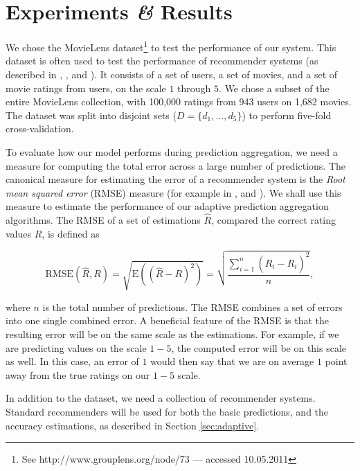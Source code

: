 \section{Experiments \emph{\&} Results}
\label{sec:results}

We chose the MovieLens dataset\footnote{
See http://www.grouplens.org/node/73 --- accessed 10.05.2011}
to test the performance of our system.
This dataset is often used to test the performance of recommender systems
(as described in 
\cite[p9]{Alshamri2008}, \cite[p4]{Lemire2005}, \cite[p1]{Adomavicius2005} and \cite[p2]{Herlocker2004}).
It consists of a set of users, a set of movies, and a set of movie ratings from users,
on the scale $1$ through $5$.
We chose a subset of the entire MovieLens collection, with 100,000 ratings from 943 users on 1,682 movies.
The dataset was split into disjoint sets
($D = \{ d_1, ..., d_5 \}$) to perform five-fold cross-validation.

To evaluate how our model performs during prediction aggregation, 
we need a measure for computing the total error across a large number of predictions.
The canonical measure for estimating the error of a recommender system
is the \emph{Root mean squared error} (RMSE) measure
(for example in \cite[p17]{Herlocker2004}, \cite[p13]{Adomavicius2005} and \cite[p6]{Bell2007}).
We shall use this measure to estimate the performance
of our adaptive prediction aggregation algorithms.
The RMSE of a set of estimations $\hat{R}$, 
compared the correct rating values $R$, is defined as

\begin{equation*}
  \mathrm{RMSE}(\hat{R},R) = \sqrt{\mathrm{E}((\hat{R} - R)^2)}
  = \sqrt{\frac{
      \sum_{i=1}^{n} (\hat{R}_i - R_i)^2
    }{
      n
    }},
\end{equation*}

where $n$ is the total number of predictions.
The RMSE combines a set of errors into one single combined error.
A beneficial feature of the RMSE is that the resulting error 
will be on the same scale as the estimations. For example,
if we are predicting values on the scale $1-5$, the computed error
will be on this scale as well. In this case, an error of $1$
would then say that we are on average $1$ point away from the true 
ratings on our $1-5$ scale.

In addition to the dataset, we need a collection of recommender systems.
Standard recommenders will be used for both the basic predictions,
and the accuracy estimations,
as described in Section \ref{sec:adaptive}.

